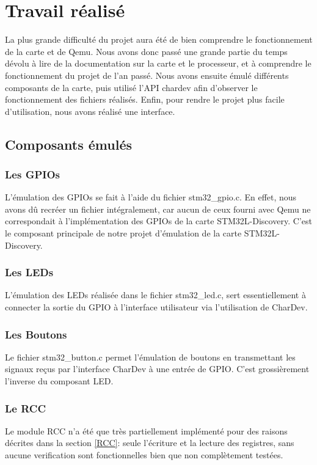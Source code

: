 \documentclass{article}
\begin{document}
		
\section{Travail réalisé}
	La plus grande difficulté du projet aura été de bien comprendre le fonctionnement de la carte et de Qemu. Nous avons donc passé 
	une grande partie du temps dévolu à lire de la documentation sur la carte et le processeur, et à comprendre le fonctionnement du projet de l'an 
	passé.
	Nous avons ensuite émulé différents composants de la carte, puis utilisé l'API chardev afin d'observer le fonctionnement des fichiers
	réalisés. Enfin, pour rendre le projet plus facile d'utilisation, nous avons réalisé une interface.
	
	\subsection{Composants émulés}
		\subsubsection{Les GPIOs}
			L'émulation des GPIOs se fait à l'aide du fichier stm32\_gpio.c. En effet, nous avons dû recréer un fichier intégralement,
			car aucun de ceux fourni avec Qemu ne correspondait à l'implémentation des GPIOs de la carte STM32L-Discovery.
			C'est le composant principale de notre projet d'émulation de la carte STM32L-Discovery. 
		\subsubsection{Les LEDs}
			L'émulation des LEDs réalisée dans le fichier stm32\_led.c, sert essentiellement à connecter la sortie du GPIO à l'interface utilisateur
			via l'utilisation de CharDev.
		\subsubsection{Les Boutons}
			Le fichier stm32\_button.c permet l'émulation de boutons en transmettant les signaux reçus par l'interface CharDev à une entrée de GPIO.
			C'est grossièrement l'inverse du composant LED.
		\subsubsection{Le RCC}
			Le module RCC n'a été que très partiellement implémenté pour des raisons décrites dans la section \ref{RCC}: seule l'écriture et la lecture des registres, 
			sans aucune verification sont fonctionnelles bien que non complètement testées.
			
\end{document}
